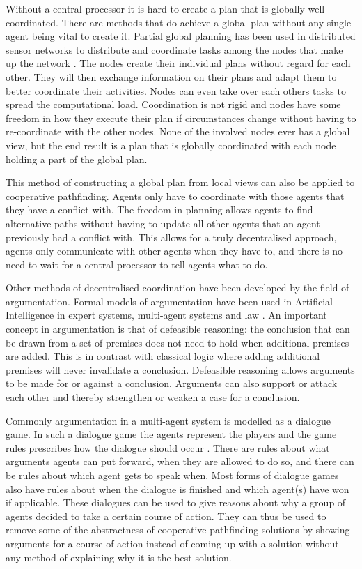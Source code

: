 Without a central processor it is hard to create a plan that is globally well
coordinated. There are methods that do achieve a global plan without any single
agent being vital to create it.
Partial global planning has been used in distributed sensor networks to
distribute and coordinate tasks among the nodes that make up the network
\cite{durfee1991}. The nodes create their individual plans without regard for
each other. They will then exchange information on their plans and adapt them
to better coordinate their activities. Nodes can even take over each others
tasks to spread the computational load. Coordination is not rigid and nodes have
some freedom in how they execute their plan if circumstances change without
having to re-coordinate with the other nodes. None of the involved nodes ever
has a global view, but the end result is a plan that is globally coordinated
with each node holding a part of the global plan.

This method of constructing a global plan from local views can also be applied
to cooperative pathfinding. Agents only have to coordinate with those agents
that they have a conflict with. The freedom in planning allows agents to find
alternative paths without having to update all other agents that an agent
previously had a conflict with. This allows for a truly decentralised approach,
agents only communicate with other agents when they have to, and there is no
need to wait for a central processor to tell agents what to do.

Other methods of decentralised coordination have been developed by the field of
argumentation. Formal models of argumentation have been used in Artificial
Intelligence in expert systems, multi-agent systems
and law \cite{vaneemeren2014}. An important concept in argumentation is that of
defeasible reasoning: the conclusion that can be drawn from a set of premises
does not need to hold when additional premises are added. This is in contrast
with classical logic where adding additional premises will never invalidate a
conclusion. Defeasible reasoning allows arguments to be made for or against a
conclusion. Arguments can also support or attack each other and thereby
strengthen or weaken a case for a conclusion.

Commonly argumentation in a multi-agent system is modelled as a dialogue game.
In such a dialogue game the agents represent the players and the game rules
prescribes how the dialogue should occur \cite{walton1995}. There are rules
about what arguments agents can put forward, when they are allowed to do so,
and there can be rules about which agent gets to speak when. Most forms of
dialogue games also have rules about when the dialogue is finished and which
agent(s) have won if applicable. These dialogues can be used to give reasons
about why a group of agents decided to take a certain course of action. They
can thus be used to remove some of the abstractness of cooperative pathfinding
solutions by showing arguments for a course of action instead of coming up with
a solution without any method of explaining why it is the best solution.


